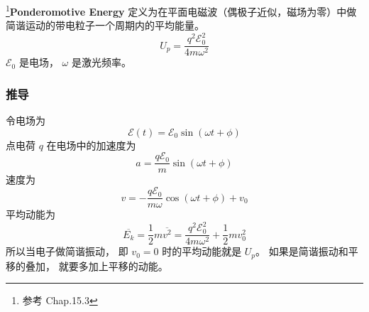 

\footnote{参考 \cite{Bransden} Chap.15.3}\textbf{Ponderomotive Energy} 定义为在平面电磁波（偶极子近似，磁场为零）中做简谐运动的带电粒子一个周期内的平均能量。
\begin{equation}\label{eq_Ponder_1}
U_p = \frac{q^2 \mathcal E_0^2}{4m\omega^2}
\end{equation}
$\mathcal E_0$ 是电场， $\omega$ 是激光频率。

\subsubsection{推导}
令电场为
\begin{equation}
\mathcal E(t) = \mathcal E_0 \sin(\omega t + \phi)
\end{equation}
点电荷 $q$ 在电场中的加速度为
\begin{equation}
a = \frac{q\mathcal E_0}{m} \sin(\omega t + \phi)
\end{equation}
速度为
\begin{equation}
v = -\frac{q\mathcal E_0}{m\omega} \cos(\omega t + \phi) + v_0
\end{equation}
平均动能为
\begin{equation}
\overline{E_k} = \frac{1}{2}m \overline{v^2} = \frac{q^2\mathcal E_0^2}{4m\omega^2} + \frac{1}{2}mv_0^2
\end{equation}
所以当电子做简谐振动， 即 $v_0 = 0$ 时的平均动能就是 $U_p$。 如果是简谐振动和平移的叠加， 就要多加上平移的动能。
